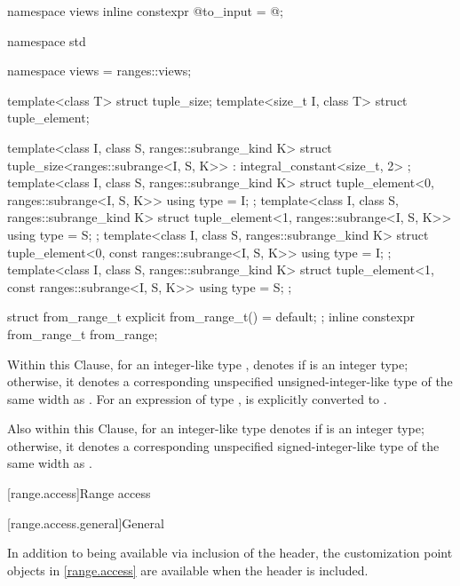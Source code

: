 \begin{codeblock}
{  namespace views { inline constexpr @\unspec@ to_input = @\unspec@; }
}

namespace std {
  namespace views = ranges::views;

  template<class T> struct tuple_size;
  template<size_t I, class T> struct tuple_element;

  template<class I, class S, ranges::subrange_kind K>
  struct tuple_size<ranges::subrange<I, S, K>>
    : integral_constant<size_t, 2> {};
  template<class I, class S, ranges::subrange_kind K>
  struct tuple_element<0, ranges::subrange<I, S, K>> {
    using type = I;
  };
  template<class I, class S, ranges::subrange_kind K>
  struct tuple_element<1, ranges::subrange<I, S, K>> {
    using type = S;
  };
  template<class I, class S, ranges::subrange_kind K>
  struct tuple_element<0, const ranges::subrange<I, S, K>> {
    using type = I;
  };
  template<class I, class S, ranges::subrange_kind K>
  struct tuple_element<1, const ranges::subrange<I, S, K>> {
    using type = S;
  };

  struct from_range_t { explicit from_range_t() = default; };
  inline constexpr from_range_t from_range{};
}
\end{codeblock}

\pnum
{}%
%
Within this Clause,
for an integer-like type ,
 denotes
 if  is an integer type;
otherwise, it denotes a corresponding unspecified unsigned-integer-like type
of the same width as .
For an expression  of type ,
 is
 explicitly converted to
.

\pnum
Also within this Clause,
 for an integer-like type 
denotes  if  is an integer type;
otherwise, it denotes a corresponding unspecified signed-integer-like type
of the same width as .

[range.access]{Range access}

[range.access.general]{General}

\pnum
In addition to being available via inclusion of the 
header, the customization point objects in \ref{range.access} are
available when the header  is included.

